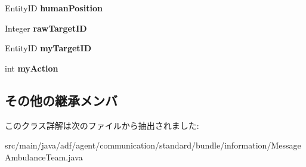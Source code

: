 \begin{DoxyCompactItemize}
Entity\+ID {\bfseries human\+Position}
\item 
\hypertarget{classadf_1_1agent_1_1communication_1_1standard_1_1bundle_1_1information_1_1MessageAmbulanceTeam_a66576eca6b7fafc7ec850366c2fc2185}{}\label{classadf_1_1agent_1_1communication_1_1standard_1_1bundle_1_1information_1_1MessageAmbulanceTeam_a66576eca6b7fafc7ec850366c2fc2185} 
Integer {\bfseries raw\+Target\+ID}
\item 
\hypertarget{classadf_1_1agent_1_1communication_1_1standard_1_1bundle_1_1information_1_1MessageAmbulanceTeam_a0f31713568c915648039f781ddb94343}{}\label{classadf_1_1agent_1_1communication_1_1standard_1_1bundle_1_1information_1_1MessageAmbulanceTeam_a0f31713568c915648039f781ddb94343} 
Entity\+ID {\bfseries my\+Target\+ID}
\item 
\hypertarget{classadf_1_1agent_1_1communication_1_1standard_1_1bundle_1_1information_1_1MessageAmbulanceTeam_afe46a1c45673803c06f42b623f081366}{}\label{classadf_1_1agent_1_1communication_1_1standard_1_1bundle_1_1information_1_1MessageAmbulanceTeam_afe46a1c45673803c06f42b623f081366} 
int {\bfseries my\+Action}
\end{DoxyCompactItemize}
\subsection*{その他の継承メンバ}


このクラス詳解は次のファイルから抽出されました\+:\begin{DoxyCompactItemize}
\item 
src/main/java/adf/agent/communication/standard/bundle/information/Message\+Ambulance\+Team.\+java\end{DoxyCompactItemize}
